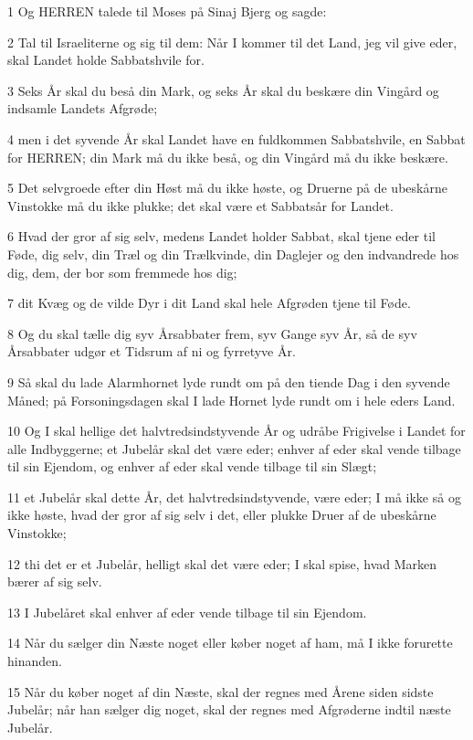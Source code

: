 \par 1 Og HERREN talede til Moses på Sinaj Bjerg og sagde:
\par 2 Tal til Israeliterne og sig til dem: Når I kommer til det Land, jeg vil give eder, skal Landet holde Sabbatshvile for.
\par 3 Seks År skal du beså din Mark, og seks År skal du beskære din Vingård og indsamle Landets Afgrøde;
\par 4 men i det syvende År skal Landet have en fuldkommen Sabbatshvile, en Sabbat for HERREN; din Mark må du ikke beså, og din Vingård må du ikke beskære.
\par 5 Det selvgroede efter din Høst må du ikke høste, og Druerne på de ubeskårne Vinstokke må du ikke plukke; det skal være et Sabbatsår for Landet.
\par 6 Hvad der gror af sig selv, medens Landet holder Sabbat, skal tjene eder til Føde, dig selv, din Træl og din Trælkvinde, din Daglejer og den indvandrede hos dig, dem, der bor som fremmede hos dig;
\par 7 dit Kvæg og de vilde Dyr i dit Land skal hele Afgrøden tjene til Føde.
\par 8 Og du skal tælle dig syv Årsabbater frem, syv Gange syv År, så de syv Årsabbater udgør et Tidsrum af ni og fyrretyve År.
\par 9 Så skal du lade Alarmhornet lyde rundt om på den tiende Dag i den syvende Måned; på Forsoningsdagen skal I lade Hornet lyde rundt om i hele eders Land.
\par 10 Og I skal hellige det halvtredsindstyvende År og udråbe Frigivelse i Landet for alle Indbyggerne; et Jubelår skal det være eder; enhver af eder skal vende tilbage til sin Ejendom, og enhver af eder skal vende tilbage til sin Slægt;
\par 11 et Jubelår skal dette År, det halvtredsindstyvende, være eder; I må ikke så og ikke høste, hvad der gror af sig selv i det, eller plukke Druer af de ubeskårne Vinstokke;
\par 12 thi det er et Jubelår, helligt skal det være eder; I skal spise, hvad Marken bærer af sig selv.
\par 13 I Jubelåret skal enhver af eder vende tilbage til sin Ejendom.
\par 14 Når du sælger din Næste noget eller køber noget af ham, må I ikke forurette hinanden.
\par 15 Når du køber noget af din Næste, skal der regnes med Årene siden sidste Jubelår; når han sælger dig noget, skal der regnes med Afgrøderne indtil næste Jubelår.
